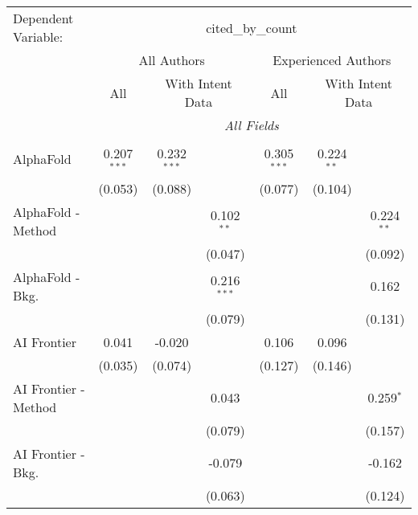 \begingroup
\centering
\begin{tabular}{lcccccc}
   \tabularnewline \midrule \midrule
   Dependent Variable: & \multicolumn{6}{c}{cited\_by\_count}\\
 & \multicolumn{3}{c}{All Authors} & \multicolumn{3}{c}{Experienced Authors} \\
\cmidrule(lr){2-4} \cmidrule(lr){5-7}
 & \multicolumn{1}{c}{All} & \multicolumn{2}{c}{With Intent Data} & \multicolumn{1}{c}{All} & \multicolumn{2}{c}{With Intent Data} \\
\cmidrule(lr){2-2} \cmidrule(lr){3-4} \cmidrule(lr){5-5} \cmidrule(lr){6-7}
 & \multicolumn{6}{c}{\textit{All Fields}} \\ \\
   AlphaFold            & 0.207$^{***}$ & 0.232$^{***}$ &               & 0.305$^{***}$ & 0.224$^{**}$ &   \\   
                        & (0.053)       & (0.088)       &               & (0.077)       & (0.104)      &   \\   
   AlphaFold - Method   &               &               & 0.102$^{**}$  &               &              & 0.224$^{**}$\\   
                        &               &               & (0.047)       &               &              & (0.092)\\   
   AlphaFold - Bkg.     &               &               & 0.216$^{***}$ &               &              & 0.162\\   
                        &               &               & (0.079)       &               &              & (0.131)\\   
   AI Frontier          & 0.041         & -0.020        &               & 0.106         & 0.096        &   \\   
                        & (0.035)       & (0.074)       &               & (0.127)       & (0.146)      &   \\   
   AI Frontier - Method &               &               & 0.043         &               &              & 0.259$^{*}$\\   
                        &               &               & (0.079)       &               &              & (0.157)\\   
   AI Frontier - Bkg.   &               &               & -0.079        &               &              & -0.162\\   
                        &               &               & (0.063)       &               &              & (0.124)\\   

\end{tabular}
